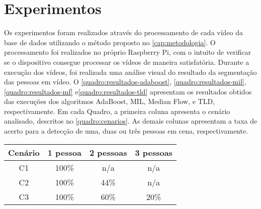 \documentclass[12pt,oneside,a4paper,chapter=TITLE,section=TITLE,sumario=tradicional]{abntex2}
\begin{document}
\begin{figure}[htb]
    \hfil
    \hfil

    \hfil
    \hfil
    
    \fonteautor
\end{figure}

\begin{figure}[htb]
    \hfil
    \hfil

    \hfil
    \hfil
    
    \fonteautor
\end{figure}

\newpage

\section{Experimentos}

Os experimentos foram realizados através do processamento de cada vídeo da base de dados utilizando o método proposto no \autoref{cap:metodologia}. O processamento foi realizados no próprio Raspberry Pi, com o intuito de verificar se o dispositivo consegue processar os vídeos de maneira satisfatória. Durante a execução dos vídeos, foi realizada uma análise visual do resultado da segmentação das pessoas em vídeo. O \autoref{quadro:resultados-adaboost}, \autoref{quadro:resultados-mil}, \autoref{quadro:resultados-mf} e\autoref{quadro:resultados-tld} apresentam os resultados obtidos das execuções dos algoritmos AdaBoost, MIL, Median Flow, e TLD, respectivamente. Em cada Quadro, a primeira coluna apresenta o cenário analisado, descritos no \autoref{quadro:cenarios}. As demais colunas apresentam a taxa de acerto para a detecção  de uma, duas ou três pessoas em cena, respectivamente. 

\begin{quadro}[htb]
    \begin{tabular}{|c||c|c|c|}
        \hline
        \textbf{Cenário} &  \textbf{1 pessoa} & \textbf{2 pessoas} & \textbf{3 pessoas} \\ 
        \hline\hline
        C1 & 100\%  & n/a & n/a\\\hline
        C2 & 100\%  & 44\% & n/a \\\hline
        C3 & 100\%  & 60\% & 20\% \\\hline

    \end{tabular}
    \fonteautor
\end{quadro}
\end{document}
